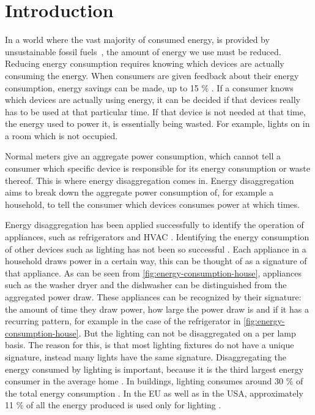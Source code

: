 
\chapter{Introduction}
\label{chp:introduction}

\vspace{1\baselineskip}

\noindent


In a world where the vast majority of consumed energy, is provided by unsustainable fossil fuels~\cite{kolter2011redd}, the amount of energy we use must be reduced.
Reducing energy consumption requires knowing which devices are actually consuming the energy.
When consumers are given feedback about their energy consumption, energy savings can be made, up to 15 \% \cite{darby2006effectiveness}.
If a consumer knows which devices are actually using energy, it can be decided if that devices really has to be used at that particular time.
If that device is not needed at that time, the energy used to power it, is essentially being wasted.
For example, lights on in a room which is not occupied.



Normal meters give an aggregate power consumption, which cannot tell a consumer which specific device is responsible for its energy consumption or waste thereof.
This is where energy disaggregation comes in.
Energy disaggregation aims to break down the aggregate power consumption of, for example a household, to tell the consumer which devices consumes power at which times.




Energy disaggregation has been applied successfully to identify the operation of appliances, such as refrigerators and HVAC \cite{kolter2011redd} \cite{spiegel2014energy}.
Identifying the energy consumption of other devices such as lighting has not been so successful \cite{spiegel2014energy} \cite{batra2015neighbourhood}.
Each appliance in a household draws power in a certain way, this can be thought of as a signature of that appliance.
As can be seen from \autoref{fig:energy-consumption-house}, appliances such as the washer dryer and the dishwasher can be distinguished from the aggregated power draw.
These appliances can be recognized by their signature: the amount of time they draw power, how large the power draw is and if it has a recurring pattern, for example in the case of the refrigerator in \autoref{fig:energy-consumption-house}.
But the lighting can not be disaggregated on a per lamp basis.
The reason for this, is that most lighting fixtures do not have a unique signature, instead many lights have the same signature.
Disaggregating the energy consumed by lighting is important, because it is the third largest energy consumer in the average home \cite{batra2015neighbourhood}.
In buildings, lighting consumes around 30 \% of the total energy consumption \cite{halonen2010guidebook}.
In the EU as well as in the USA, approximately 11 \% of all the energy produced is used only for lighting \cite{bertoldi2009electricity} \cite{outlook2010energy}.

